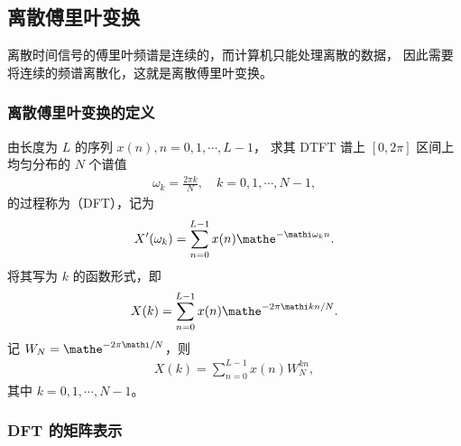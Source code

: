 \subsection{离散傅里叶变换}

离散时间信号的傅里叶频谱是连续的，而计算机只能处理离散的数据，
因此需要将连续的频谱离散化，这就是离散傅里叶变换。

\subsubsection{离散傅里叶变换的定义}

\begin{definition}
    由长度为 $L$ 的序列 $x(n), n = 0, 1, \cdots, L - 1$，
    求其 DTFT 谱上 $[0, 2\pi]$ 区间上均匀分布的 $N$ 个谱值
    \begin{align*}
        \omega_k = \frac{2\pi k}{N}, \quad k = 0, 1, \cdots, N - 1,
    \end{align*}
    的过程称为（DFT），记为
    \begin{align*}
        X'(\omega_k) = \sum_{n = 0}^{L - 1}x(n)\mathe^{-\mathi\omega_k n}.
    \end{align*}
    将其写为 $k$ 的函数形式，即
    \begin{align*}
        X(k) = \sum_{n = 0}^{L - 1}x(n)\mathe^{-2\pi\mathi k n/N}.
    \end{align*}
    记 $W_N = \mathe^{-2\pi\mathi/N}$，则
    \begin{align*}
        X(k) = \sum_{n = 0}^{L - 1}x(n)W_N^{kn},
    \end{align*}
    其中 $k = 0, 1, \cdots, N - 1$。
\end{definition}

\subsubsection{DFT 的矩阵表示}

